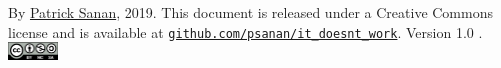 \documentclass{article}
\begin{document}
\vspace{10pt}
\begin{center}
{\small
By \href{https://www.patricksanan.com}{Patrick Sanan}, 2019.
This document is released under a Creative Commons license and is available at
\href{https://github.com/psanan/it_doesnt_work}{\texttt{github.com/psanan/it\_doesnt\_work}}.
Version 1.0 .\\
\vspace{10pt}
\includegraphics[width=50px]{by-nc-sa.png}
}
\end{center}
\end{document}
